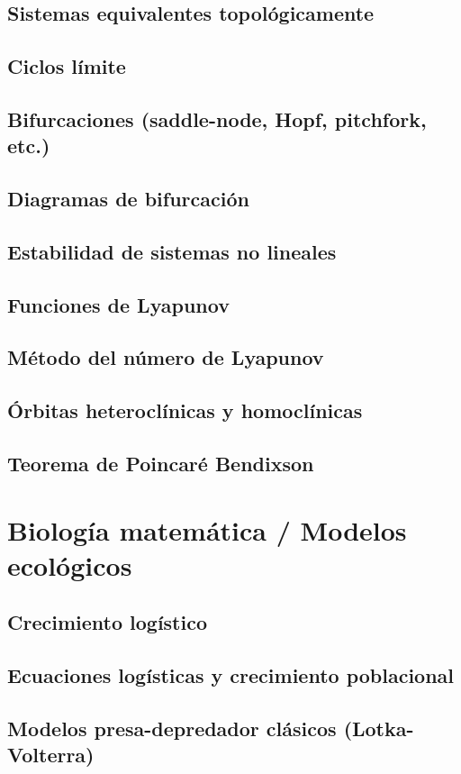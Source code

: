     \subsection{Sistemas equivalentes topológicamente}
    \subsection{Ciclos límite}
    \subsection{Bifurcaciones (saddle-node, Hopf, pitchfork, etc.)}
    \subsection{Diagramas de bifurcación}
    \subsection{Estabilidad de sistemas no lineales}
    \subsection{Funciones de Lyapunov}
    \subsection{Método del número de Lyapunov}
    \subsection{Órbitas heteroclínicas y homoclínicas}
    \subsection{Teorema de Poincaré Bendixson}
    
    \section{Biología matemática / Modelos ecológicos}
    \subsection{Crecimiento logístico}
    \subsection{Ecuaciones logísticas y crecimiento poblacional}
    \subsection{Modelos presa-depredador clásicos (Lotka-Volterra)}

